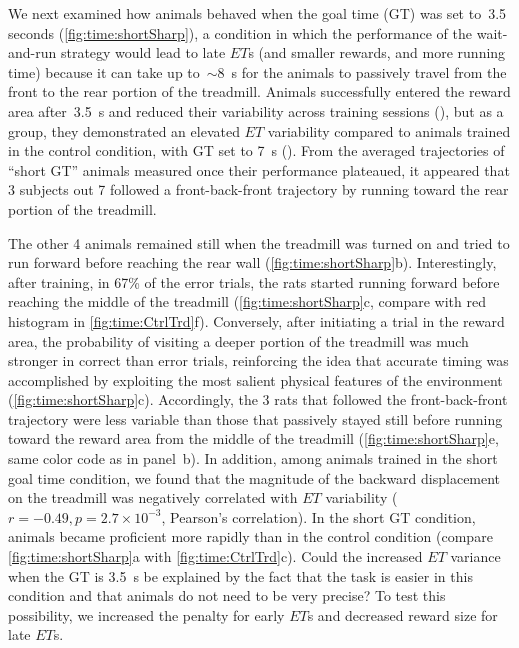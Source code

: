 We next examined how animals behaved when the goal time (GT) was set to~3.5 seconds (\autoref{fig:time:shortSharp}), a condition in which the performance of the wait-and-run strategy would lead to late $ET$s (and smaller rewards, and more running time) because it can take up to~$\sim$8~s for the animals to passively travel from the front to the rear portion of the treadmill.
Animals successfully entered the reward area after~3.5~s and reduced their variability across training sessions (), but as a group, they demonstrated an elevated $ET$ variability compared to animals trained in the control condition, with GT set to 7~s ().
From the averaged trajectories of ``short GT'' animals measured once their performance plateaued, it appeared that 3 subjects out 7 followed a front-back-front trajectory by running toward the rear portion of the treadmill.

The other 4 animals remained still when the treadmill was turned on and tried to run forward before reaching the rear wall (\autoref{fig:time:shortSharp}b).
Interestingly, after training, in 67\% of the error trials, the rats started running forward before reaching the middle of the treadmill (\autoref{fig:time:shortSharp}c, compare with red histogram in \autoref{fig:time:CtrlTrd}f).
Conversely, after initiating a trial in the reward area, the probability of visiting a deeper portion of the treadmill was much stronger in correct than error trials, reinforcing the idea that accurate timing was accomplished by exploiting the most salient physical features of the environment (\autoref{fig:time:shortSharp}c).
Accordingly, the 3 rats that followed the front-back-front trajectory were less variable than those that passively stayed still before running toward the reward area from the middle of the treadmill (\autoref{fig:time:shortSharp}e, same color code as in panel~b).
In addition, among animals trained in the short goal time condition, we found that the magnitude of the backward displacement on the treadmill was negatively correlated with $ET$ variability ($r=-0.49, p=2.7\times 10^{-3}$, Pearson's correlation).
In the short GT condition, animals became proficient more rapidly than in the control condition (compare \autoref{fig:time:shortSharp}a with \autoref{fig:time:CtrlTrd}c).
Could the increased $ET$ variance when the GT is 3.5~s be explained by the fact that the task is easier in this condition and that animals do not need to be very precise?
To test this possibility, we increased the penalty for early $ET$s and decreased reward size for late $ET$s.
